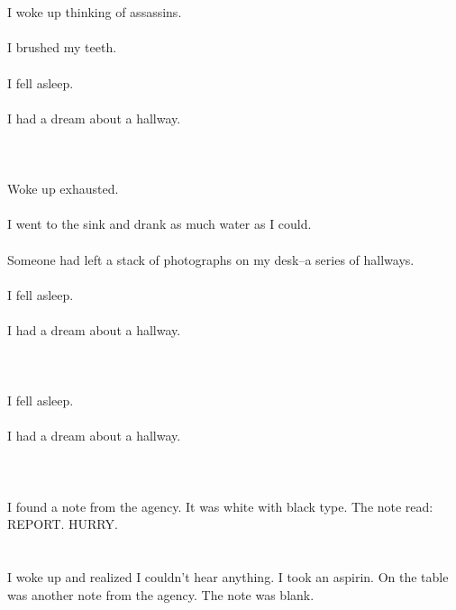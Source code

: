 \documentclass{article}
\begin{document}
    \section{}
    I woke up thinking of assassins.\\\\I brushed my teeth.\\\\I fell asleep.\\\\I had a dream about a hallway.\\\\ 
    \newpage
    
    \section{}
    Woke up exhausted.\\\\I went to the sink and drank as much water as I could.\\\\Someone had left a stack of photographs on my desk--a series of hallways.\\\\I fell asleep.\\\\I had a dream about a hallway.\\\\ 
    \newpage
    
    \section{}
    I fell asleep.\\\\I had a dream about a hallway.\\\\ 
    \newpage
    
    \section{}
    I found a note from the agency. It was white with black type. The note read: REPORT. HURRY.  
    \newpage
    
    \section{}
    I woke up and realized I couldn't hear anything. I took an aspirin. On the table was another note from the agency. The note was blank.  
    \newpage
    
\end{document}

